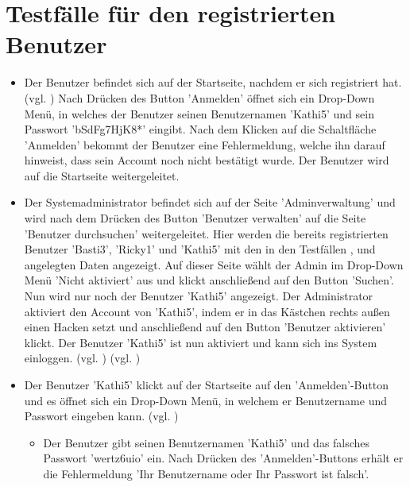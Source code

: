 \documentclass[a4paper]{scrreprt}
\newcounter{Lc}
\newcounter{Hc}
\newcommand{\stepHc}{\stepcounter{Hc}\setcounter{Lc}{0}}
\begin{document}
	\section{Testfälle für den registrierten Benutzer}
		\stepHc
		\begin{itemize}
			\item {}
			Der Benutzer befindet sich auf der Startseite, nachdem er sich registriert hat. (vgl. ) Nach Drücken des Button 'Anmelden' öffnet sich ein Drop-Down Menü, in welches der Benutzer seinen Benutzernamen 'Kathi5' und sein Passwort 'bSdFg7HjK8*' eingibt. Nach dem Klicken auf die Schaltfläche 'Anmelden' bekommt der Benutzer eine Fehlermeldung, welche ihn darauf hinweist, dass sein Account noch nicht bestätigt wurde. Der Benutzer wird auf die Startseite weitergeleitet.
			
			\item {}
			Der Systemadministrator befindet sich auf der Seite 'Adminverwaltung' und wird nach dem Drücken des Button 'Benutzer verwalten' auf die Seite 'Benutzer durchsuchen' weitergeleitet. Hier werden die bereits registrierten Benutzer 'Basti3', 'Ricky1' und 'Kathi5' mit den in den Testfällen ,  und  angelegten Daten angezeigt. Auf dieser Seite wählt der Admin im Drop-Down Menü 'Nicht aktiviert' aus und klickt anschließend auf den Button 'Suchen'. Nun wird nur noch der Benutzer 'Kathi5' angezeigt. Der Administrator aktiviert den Account von 'Kathi5', indem er in das Kästchen rechts außen einen Hacken setzt und anschließend auf den Button 'Benutzer aktivieren' klickt. Der Benutzer 'Kathi5' ist nun aktiviert und kann sich ins System einloggen. (vgl. )  
			(vgl. )
			
			
			\item {} 
			Der Benutzer 'Kathi5' klickt auf der Startseite	auf den 'Anmelden'-Button und es öffnet sich ein Drop-Down Menü, in welchem er Benutzername und Passwort eingeben kann. (vgl. )
			\begin{itemize}
				\item Der Benutzer gibt seinen Benutzernamen 'Kathi5' und das falsches Passwort 'wertz6uio' ein. Nach Drücken des 'Anmelden'-Buttons erhält er die Fehlermeldung 'Ihr Benutzername oder Ihr Passwort ist falsch'.


\end{itemize}
\end{itemize}
\end{document}

